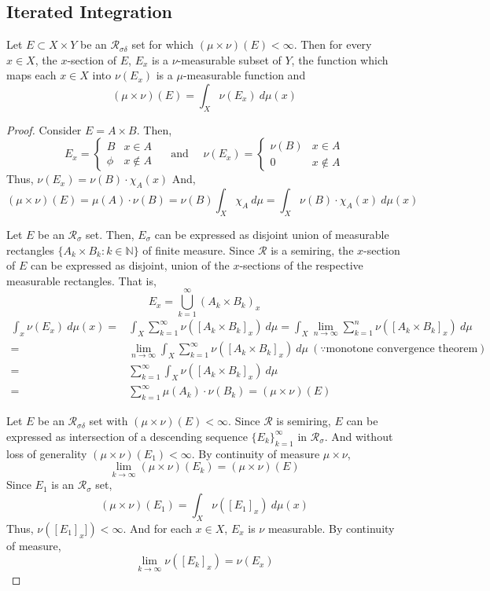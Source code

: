 \subsection{Iterated Integration}
\begin{lemma}
	Let $E \subset X \times Y$ be an $\mathcal{R}_{\sigma\delta}$ set for which $(\mu \times \nu)(E) < \infty$.
	Then for every $x \in X$, the $x$-section of $E$, $E_x$ is a $\nu$-measurable subset of $Y$, the function which maps each $x \in X$ into $\nu(E_x)$ is a $\mu$-measurable function and
	\begin{equation}
		(\mu \times \nu)(E) = \int_X \nu(E_x) \ d\mu(x)
	\end{equation}
\end{lemma}
\begin{proof}
	Consider $E = A \times B$.
	Then,
	$$ E_x = \begin{cases} B & x \in A \\ \phi & x \notin A \end{cases} \quad \text{ and } \quad \nu(E_x) = \begin{cases} \nu(B) & x \in A \\ 0 & x \notin A \end{cases} $$
	Thus, $\nu(E_x) = \nu(B) \cdot \chi_A(x)$
	And,
	$$(\mu \times \nu)(E) = \mu(A) \cdot \nu(B) = \nu(B) \int_X \chi_A \ d\mu = \int_X \nu(B) \cdot \chi_A(x) \ d\mu(x) $$

	Let $E$ be an $\mathcal{R}_\sigma$ set.
	Then, $E_\sigma$ can be expressed as disjoint union of measurable rectangles $\{ A_k \times B_k : k \in \mathbb{N} \}$ of finite measure.
	Since $\mathcal{R}$ is a semiring, the $x$-section of $E$ can be expressed as disjoint, union of the $x$-sections of the respective measurable rectangles. That is,
	$$ E_x = \bigcup_{k=1}^\infty (A_k \times B_k)_x $$
	\begin{align*}
		\int_x \nu(E_x) \ d\mu(x)
		= & \int_X \sum_{k=1}^\infty \nu([A_k \times B_k]_x) \ d\mu
		= \int_X \lim_{n \to \infty} \sum_{k=1}^n \nu( [A_k \times B_k]_x) \ d\mu \\
		= & \lim_{n \to \infty} \int_X \sum_{k=1}^\infty \nu([A_k \times B_k]_x) \ d\mu \ (\because \text{monotone convergence theorem}) \\
		= & \sum_{k=1}^\infty \int_X \nu([A_k \times B_k]_x) \ d\mu \\
		= & \sum_{k=1}^\infty \mu(A_k) \cdot \nu(B_k) 
		= (\mu \times \nu)(E)
	\end{align*}

	Let $E$ be an $\mathcal{R}_{\sigma\delta}$ set with $(\mu \times \nu)(E) < \infty$.
	Since $\mathcal{R}$ is semiring, $E$ can be expressed as intersection of a descending sequence $\{ E_k \}_{k=1}^\infty$ in $\mathcal{R}_\sigma$.
	And without loss of generality $(\mu \times \nu)(E_1) < \infty$.
	By continuity of measure $\mu \times \nu$,
	$$ \lim_{k \to \infty} (\mu \times \nu)(E_k) = (\mu \times \nu)(E) $$
	Since $E_1$ is an $\mathcal{R}_\sigma$ set,
	$$ (\mu \times \nu)(E_1) = \int_X \nu([E_1]_x) \ d\mu(x)  $$
	Thus, $\nu([E_1]_x]) < \infty$.
	And for each $x \in X$, $E_x$ is $\nu$ measurable.
	By continuity of measure,
	$$ \lim_{k \to \infty} \nu([E_k]_x) = \nu(E_x) $$
\end{proof}

